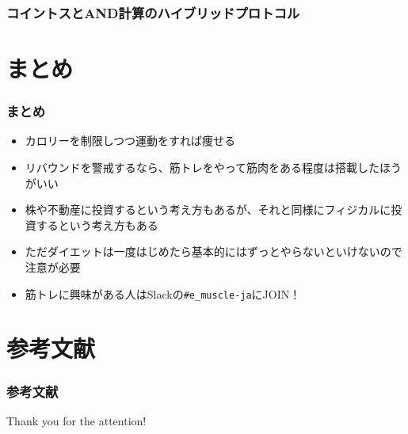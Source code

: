 \begin{frame}
  \frametitle{コイントスとAND計算のハイブリッドプロトコル}


\end{frame}

\section{まとめ}

\begin{frame}
  \frametitle{まとめ}

  \pause
  \begin{itemize}
    \item<+-> カロリーを制限しつつ運動をすれば痩せる

    \item<+-> リバウンドを警戒するなら、筋トレをやって筋肉をある程度は搭載したほうがいい

    \item<+-> 株や不動産に投資するという考え方もあるが、それと同様にフィジカルに投資するという考え方もある

    \item<+-> ただダイエットは一度はじめたら基本的にはずっとやらないといけないので注意が必要

    \item<+-> 筋トレに興味がある人はSlackの\texttt{\#e\_muscle-ja}にJOIN！
  \end{itemize}
\end{frame}

\section*{参考文献}
\begin{frame}%
  \frametitle{参考文献}
  \nocite{*}
  
  
\end{frame}

\begin{frame}
  \centering
  {\Huge Thank you for the attention!}
\end{frame}


